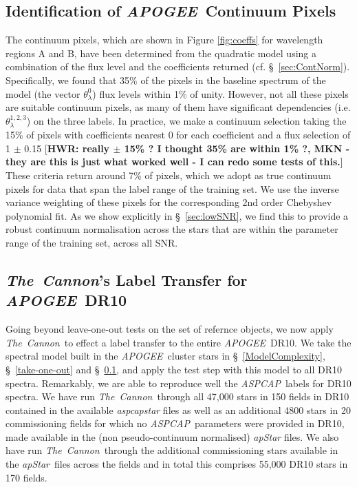 \documentclass[12pt, preprint]{aastex}
\newcommand{\tc}{\textsl{The~Cannon}}
\newcommand{\apogee}{\textsl{APOGEE}}
\newcommand{\aspcap}{\textsl{ASPCAP}}
\newcommand{\apstar}{\textsl{apStar}}
\begin{document}
\subsection{Identification of \apogee\ Continuum Pixels}
\label{sec:ApogeeContinuum}

The continuum pixels, which are shown in Figure \ref{fig:coeffs} for wavelength regions A and B, 
have been determined from the quadratic model using a combination of the flux level and the coefficients returned
(cf. \S~\ref{sec:ContNorm}). Specifically, we found that 35\% of the pixels in the baseline spectrum of the model (the vector $\theta^0_\lambda$) flux levels within 1\% of unity. However, not all these pixels are suitable continuum pixels, as many of them have significant dependencies (i.e. $\theta^{1,2,3}_\lambda$)
on the three labels. 
In practice, we make a continuum selection taking the 15\% of pixels with coefficients nearest 0 for each coefficient and a flux selection of 1 $\pm$ 0.15 [{\bf HWR: really $\pm$ 15\% ? I thought 35\% are within 1\% ?, MKN - they are this is just what worked well - I can redo some tests of this.}]
These criteria return around 7\% of pixels, which we adopt as true continuum pixels for data that span the label range of the training set. We use the inverse variance weighting of these pixels for the corresponding 2nd order Chebyshev polynomial fit. 
As we show explicitly in \S~\ref{sec:lowSNR}, we find this to provide a robust continuum normalisation across the stars that are within the parameter range of the training set, 
across all SNR. 

\subsection{\tc 's Label Transfer for \apogee\ DR10}
\label{sec:APOGEE_DR10_comparison}

Going beyond leave-one-out tests on the set of refernce objects, we now apply \tc\ to effect a label transfer to the entire \apogee\ DR10.
We take the spectral model built in the \apogee\ cluster stars in \S~\ref{ModelComplexity}, \S~\ref{take-one-out} and \S~\ref{sec:ApogeeContinuum},
and apply the test step with this model to all DR10 spectra.
Remarkably, we are able to reproduce well the \aspcap\ labels for DR10 spectra. We have run \tc\ through all 47,000 stars in 150 fields in DR10 contained in the available \textit{aspcapstar} files as well as an additional 4800 stars in 20 commissioning fields for which no \aspcap\ parameters were provided in DR10, 
made available in the (non pseudo-continuum normalised) \textit{apStar} files. 
We also have run \tc\ through the additional commissioning stars available in the \apstar\ files across the fields and in total this
 comprises 55,000 DR10 stars in 170 fields. %
\end{document}
